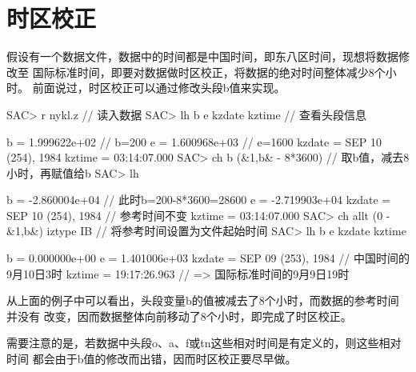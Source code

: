\section{时区校正}
\label{sec:time-zone-correction}
假设有一个数据文件，数据中的时间都是中国时间，即东八区时间，现想将数据修改至
国际标准时间，即要对数据做时区校正，将数据的绝对时间整体减少8个小时。
前面说过，时区校正可以通过修改头段b值来实现。

\begin{SACCode}
SAC> r nykl.z                          // 读入数据
SAC> lh b e kzdate kztime              // 查看头段信息

          b = 1.999622e+02             // b=200
          e = 1.600968e+03             // e=1600
     kzdate = SEP 10 (254), 1984
     kztime = 03:14:07.000
SAC> ch b (&1,b& - 8*3600)             // 取b值，减去8小时，再赋值给b
SAC> lh

          b = -2.860004e+04            // 此时b=200-8*3600=28600
          e = -2.719903e+04
     kzdate = SEP 10 (254), 1984       // 参考时间不变
     kztime = 03:14:07.000
SAC> ch allt (0 - &1,b&) iztype IB     // 将参考时间设置为文件起始时间
SAC> lh b e kzdate kztime

          b = 0.000000e+00
          e = 1.401006e+03
     kzdate = SEP 09 (253), 1984       // 中国时间的9月10日3时
     kztime = 19:17:26.963             // => 国际标准时间的9月9日19时
\end{SACCode}

从上面的例子中可以看出，头段变量b的值被减去了8个小时，而数据的参考时间并没有
改变，因而数据整体向前移动了8个小时，即完成了时区校正。

需要注意的是，若数据中头段o、a、f或tn这些相对时间是有定义的，则这些相对时间
都会由于b值的修改而出错，因而时区校正要尽早做。
